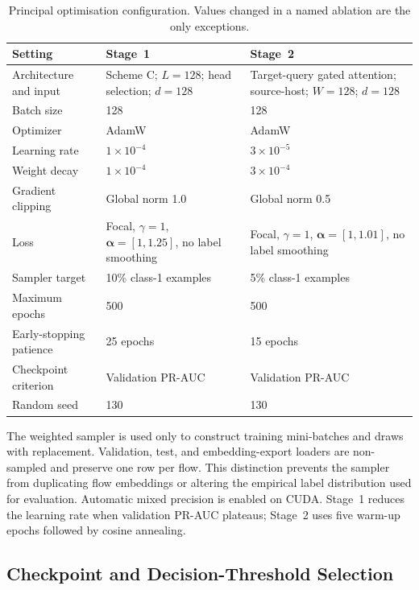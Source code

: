 \documentclass[11pt,fleqn]{report}
\begin{document}
\begin{table}[H]
    \centering
    \caption{Principal optimisation configuration. Values changed in a named ablation are the only exceptions.}
    \label{tab:experimental_training_config}
    \begin{tabular}{@{}p{3.0cm}p{4.6cm}p{5.7cm}@{}}
        \toprule
        Setting & Stage~1 & Stage~2 \\
        \midrule
        Architecture and input & Scheme C; $L=128$; head selection; $d=128$ & Target-query gated attention; source-host; $W=128$; $d=128$ \\
        Batch size & 128 & 128 \\
        Optimizer & AdamW & AdamW \\
        Learning rate & $1\times10^{-4}$ & $3\times10^{-5}$ \\
        Weight decay & $1\times10^{-4}$ & $3\times10^{-4}$ \\
        Gradient clipping & Global norm 1.0 & Global norm 0.5 \\
        Loss & Focal, $\gamma=1$, $\boldsymbol{\alpha}=[1,1.25]$, no label smoothing & Focal, $\gamma=1$, $\boldsymbol{\alpha}=[1,1.01]$, no label smoothing \\
        Sampler target & 10\% class-1 examples & 5\% class-1 examples \\
        Maximum epochs & 500 & 500 \\
        Early-stopping patience & 25 epochs & 15 epochs \\
        Checkpoint criterion & Validation PR-AUC & Validation PR-AUC \\
        Random seed & 130 & 130 \\
        \bottomrule
    \end{tabular}
\end{table}

The weighted sampler is used only to construct training mini-batches and draws with replacement. Validation, test, and embedding-export loaders are non-sampled and preserve one row per flow. This distinction prevents the sampler from duplicating flow embeddings or altering the empirical label distribution used for evaluation. Automatic mixed precision is enabled on CUDA. Stage~1 reduces the learning rate when validation PR-AUC plateaus; Stage~2 uses five warm-up epochs followed by cosine annealing.

\subsection{Checkpoint and Decision-Threshold Selection}
\label{subsubsec:experimental_thresholding}
\end{document}

